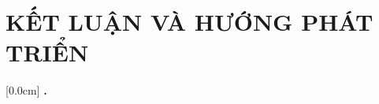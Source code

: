 \documentclass[a4paper,13pt,3p,twoside]{report}
\renewcommand{\bibname}{Danh_sach_tai_lieu_tham_khao}
\theoremstyle{definition}
\begin{document}
\chapter{KẾT LUẬN VÀ HƯỚNG PHÁT TRIỂN} %
\label{chapter:conclusion}


% 


\newpage
\renewcommand\bibname{TÀI LIỆU THAM KHẢO}
\printbibliography
{}




    [0.0cm]             %
    {\bfseries\vspace{0.3cm}}                  %
    {{\bfseries{\scshape} \thecontentslabel.\ }} %
    {}         %
    {\contentspage}         %
% 
% 
\end{document}
